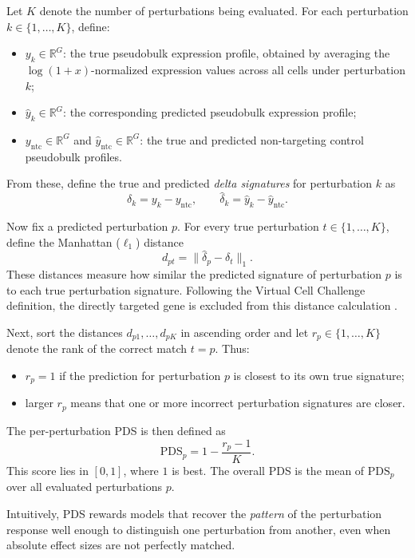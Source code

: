 \documentclass[12pt]{article}
\begin{document}
Let \(K\) denote the number of perturbations being evaluated. For each perturbation
\(k \in \{1,\dots,K\}\), define:
\begin{itemize}
    \item \(y_k \in \mathbb{R}^G\): the true pseudobulk expression profile, obtained by averaging the
    \(\log(1+x)\)-normalized expression values across all cells under perturbation \(k\);
    \item \(\hat{y}_k \in \mathbb{R}^G\): the corresponding predicted pseudobulk expression profile;
    \item \(y_{\mathrm{ntc}} \in \mathbb{R}^G\) and \(\hat{y}_{\mathrm{ntc}} \in \mathbb{R}^G\): the true and predicted
    non-targeting control pseudobulk profiles.
\end{itemize}

From these, define the true and predicted \emph{delta signatures} for perturbation \(k\) as
\[
\delta_k = y_k - y_{\mathrm{ntc}},
\qquad
\hat{\delta}_k = \hat{y}_k - \hat{y}_{\mathrm{ntc}}.
\]

Now fix a predicted perturbation \(p\). For every true perturbation \(t \in \{1,\dots,K\}\), define the
Manhattan (\(\ell_1\)) distance
\[
d_{pt} = \|\hat{\delta}_p - \delta_t\|_1 .
\]
These distances measure how similar the predicted signature of perturbation \(p\) is to each true
perturbation signature. Following the Virtual Cell Challenge definition, the directly targeted gene is
excluded from this distance calculation \cite{virtualcellchallenge_eval}.

Next, sort the distances \(d_{p1},\dots,d_{pK}\) in ascending order and let \(r_p \in \{1,\dots,K\}\) denote
the rank of the correct match \(t=p\). Thus:
\begin{itemize}
    \item \(r_p = 1\) if the prediction for perturbation \(p\) is closest to its own true signature;
    \item larger \(r_p\) means that one or more incorrect perturbation signatures are closer.
\end{itemize}

The per-perturbation PDS is then defined as
\[
\mathrm{PDS}_p = 1 - \frac{r_p - 1}{K}.
\]
This score lies in \([0,1]\), where \(1\) is best. The overall PDS is the mean of \(\mathrm{PDS}_p\) over all
evaluated perturbations \(p\).

Intuitively, PDS rewards models that recover the \emph{pattern} of the perturbation response well
enough to distinguish one perturbation from another, even when absolute effect sizes are not
perfectly matched.
\end{document}
